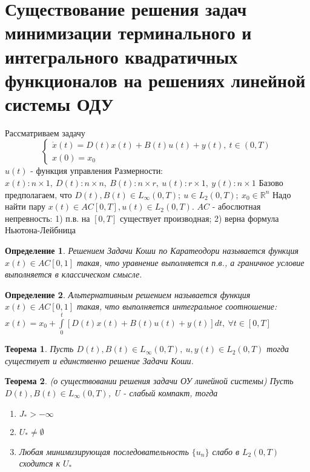 \documentclass[9pt, a4paper]{extarticle}
\newtheorem*{theorem}{Теорема}
\newtheorem*{definition}{Определение}
\begin{document}
\section{Существование решения задач минимизации терминального и интегрального квадратичных функционалов на решениях линейной системы ОДУ }
	Рассматриваем задачу
	\begin{equation*}
		\begin{cases}
			\dot{x}(t) = D(t) x(t) + B(t) u(t) + y(t), \ t \in (0, T) \\ 
			x(0) = x_0
		\end{cases}
	\end{equation*}
	$u(t)$ - функция управления \newline
	Размерности: $x(t): n\times 1, \ D(t): n \times n, \ B(t) : n \times r, \ u(t): r\times 1, \ y(t): n \times 1$ \newline
	Базово предполагаем, что $D(t), B(t) \in L_\infty(0,T); \ u \in L_2(0,T); \ x_0 \in \mathbb{R}^n$\newline
	Надо найти пару $x(t) \in AC[0,T], u(t) \in L_2(0,T)$. $AC$ - абослютная непревность: 1) п.в. на $[0,T]$ существует производная; 2) верна формула Ньютона-Лейбница
	\begin{definition}
		Решением Задачи Коши по Каратеодори называется функция $x(t) \in AC[0,1]$ такая, что уравнение выполняется п.в., а граничное условие выполняется в классическом смысле. 
	\end{definition}
	\begin{definition}
		Альтернативным решением называется функция $x(t) \in AC[0,1]$ такая, что выполняется интегральное соотношение: $x(t) = x_0 + \int\limits_0^t \left[D(t) x(t) + B(t) u(t) + y(t)\right] dt,\  \forall t \in [0,T]$
	\end{definition}
	\begin{theorem}
		Пусть $D(t), B(t) \in L_\infty(0,T), \ u, y(t) \in L_2(0,T)$ тогда существует и единственно решение Задачи Коши. 
	\end{theorem}
	\begin{theorem}
		(о существовании решения задачи ОУ линейной системы)\newline
			Пусть $D(t), B(t) \in L_\infty(0,T)$, U - слабый компакт, тогда 
					 \begin{enumerate}
				\item $J_* > -\infty$
				\item $U_* \neq \emptyset$
				\item Любая минимизирующая последовательность $\{u_n\}$ слабо в $L_2(0,T)$ сходится к $U_*$
			\end{enumerate}
	\end{theorem}
\end{document}

